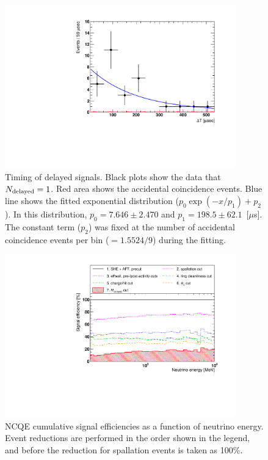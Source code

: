 \begin{figure}[H]
	\centering
	\includegraphics[width=10cm]{PDF/Figure03/Figure03}
	\caption[Timing of delayed signals]{
	Timing of delayed signals.
	Black plots show the data that $N_{\rm delayed} = 1$.
	Red area shows the accidental coincidence events.
	Blue line shows the fitted exponential distribution ($p_{0}\exp(-x/p_{1}) + p_{2}$).
	In this distribution, $p_{0} = 7.646 \pm 2.470$ and $p_{1} = 198.5 \pm 62.1$~[$\mu$s].
	The constant term ($p_{2}$) was fixed at the number of accidental coincidence events per bin ($=1.5524/9$) during the fitting.
	}\label{Figure03}
\end{figure}

\begin{figure}[H]
	\centering
	\includegraphics[width=10cm]{PDF/Figure06/FTFP_BERT_HP/Figure06}
	\caption[NCQE cumulative signal efficiencies as a function of neutrino energy]{
	NCQE cumulative signal efficiencies as a function of neutrino energy.
	Event reductions are performed in the order shown in the legend, and before the reduction for spallation events is taken as 100\%.
	}\label{BERT_Figure06}
\end{figure}

